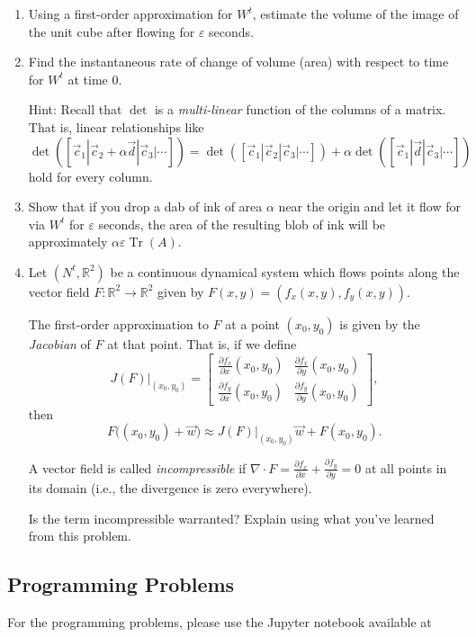 \documentclass[letter]{article}
\newcommand{\R}{\mathbb{R}}
\newcommand{\mat}[1]{\begin{bmatrix}#1\end{bmatrix}}
\DeclareMathOperator{\Tr}{Tr}
\begin{document}
\begin{enumerate}
\begin{enumerate}
				\item Using a first-order approximation for $W^t$, estimate the volume of the image of the unit cube
					after flowing for $\varepsilon$ seconds.

				\item Find the instantaneous rate of change of volume (area) with respect to time for $W^t$ at time $0$.

					Hint: Recall that $\det$ is a \emph{multi-linear} function of the columns of a matrix. 
					That is, linear relationships like $\det([\vec c_1|\vec c_2+\alpha \vec d|\vec c_3|\cdots])
					=\det([\vec c_1|\vec c_2|\vec c_3|\cdots])
					+\alpha\det([\vec c_1|\vec d|\vec c_3|\cdots])$ hold for every column.

				\item Show that if you drop a dab of ink of area $\alpha$ near the origin and let it flow for via $W^t$
					for $\varepsilon$ seconds,
					the area of the resulting blob of ink will be approximately $\alpha\varepsilon\Tr(A)$.
				\item Let $(N^t, \R^2)$ be a continuous dynamical system which flows points along the vector field
					$F:\R^2\to\R^2$ given by $F(x,y) = (f_x(x,y), f_y(x,y))$. 

					The first-order approximation to $F$ at a point $(x_0,y_0)$ is given by the \emph{Jacobian}
					of $F$ at that point. That is, if we define
					\[
						J(F)\big|_{(x_0,y_0)} = \mat{
							\frac{\partial f_x}{\partial x}(x_0,y_0) & \frac{\partial f_x}{\partial y}(x_0,y_0)\\[2pt]
							\frac{\partial f_y}{\partial x}(x_0,y_0) & \frac{\partial f_y}{\partial y}(x_0,y_0)
						},
					\]
					then 
					\[
						F\big((x_0,y_0) + \vec w\big) \approx J(F)\big|_{(x_0,y_0)}\vec w + F(x_0,y_0).
					\]

					A vector field is called \emph{incompressible} if $\nabla \cdot F = \frac{\partial f_x}{\partial x} + 
					\frac{\partial f_y}{\partial y}=0$ at all points in its domain (i.e., the divergence is zero everywhere).

					Is the term incompressible warranted? Explain using what you've learned from this problem.
			\end{enumerate}


	\end{enumerate}


	\subsection*{Programming Problems}
	For the programming problems, please use the Jupyter notebook available at
\end{document}
